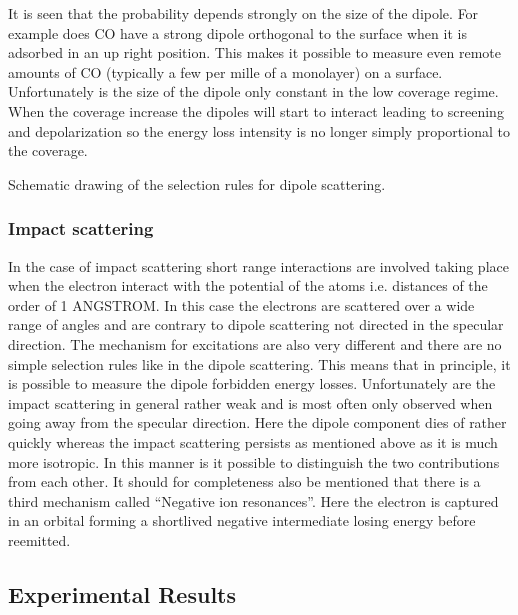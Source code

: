 It is seen that the probability depends strongly on the size of the dipole. For example does CO have a strong dipole orthogonal to the surface when it is adsorbed in an up right position.  This makes it possible to measure  even remote amounts of CO (typically a few per mille of a monolayer) on a surface. Unfortunately is  the size of the dipole only constant in the low coverage regime. When the coverage increase the dipoles will start to interact  leading to screening and depolarization so the energy loss intensity is no longer simply  proportional to the coverage. 

\vspace*{11cm}

 Schematic drawing of the selection rules for dipole scattering.

\vspace{1cm}
 

\subsubsection{Impact scattering}

In the case of impact scattering  short range interactions are involved taking  place when the electron interact with the potential of the atoms i.e. distances  of the order of 1 ANGSTROM.  In this case the electrons are scattered over a wide range of angles and are contrary to dipole scattering not directed in the specular direction. The mechanism for excitations are also very different and there are no simple selection rules like in the dipole scattering. This means that in principle, it is possible to measure the dipole forbidden energy losses. Unfortunately are the impact scattering in general rather weak and is most often only observed when going away from the specular direction. Here the dipole component dies of rather quickly whereas the impact scattering persists as mentioned above as it is much more isotropic. In this manner is it possible to distinguish  the two contributions from each other. It should for completeness also be mentioned that there is a third mechanism called ``Negative ion resonances''. Here the electron is captured in an orbital forming a shortlived negative intermediate losing energy before reemitted. 


\subsection{Experimental Results}

